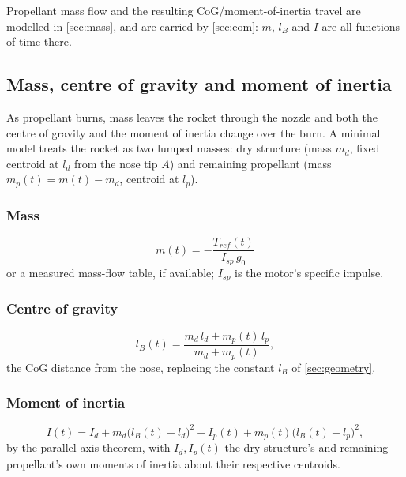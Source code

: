 Propellant mass flow and the resulting CoG/moment-of-inertia travel are modelled in
\autoref{sec:mass}, and are carried by \autoref{sec:eom}: $m$, $l_B$ and $I$ are all functions of
time there.

\subsection{Mass, centre of gravity and moment of inertia}\label{sec:mass}
As propellant burns, mass leaves the rocket through the nozzle and both the centre of gravity and
the moment of inertia change over the burn. A minimal model treats the rocket as two lumped
masses: dry structure (mass $m_d$, fixed centroid at $l_d$ from the nose tip $A$) and remaining
propellant (mass $m_p(t)=m(t)-m_d$, centroid at $l_p$).

\subsubsection{Mass}
\begin{equation}
    \dot{m}(t) = -\frac{T_{ref}(t)}{I_{sp}\,g_0}
\end{equation}
or a measured mass-flow table, if available; $I_{sp}$ is the motor's specific impulse.

\subsubsection{Centre of gravity}
\begin{equation}
    l_B(t) = \frac{m_d\,l_d + m_p(t)\,l_p}{m_d + m_p(t)},
\end{equation}
the CoG distance from the nose, replacing the constant $l_B$ of \autoref{sec:geometry}.

\subsubsection{Moment of inertia}
\begin{equation}
    I(t) = I_d + m_d\bigl(l_B(t)-l_d\bigr)^2 + I_p(t) + m_p(t)\bigl(l_B(t)-l_p\bigr)^2,
\end{equation}
by the parallel-axis theorem, with $I_d,I_p(t)$ the dry structure's and remaining propellant's own
moments of inertia about their respective centroids.

